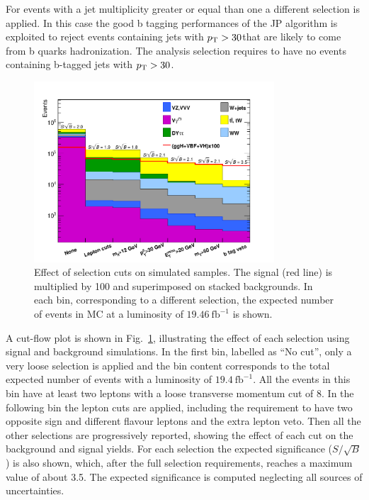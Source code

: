 For events with a jet multiplicity greater or equal than one a different selection is applied. In this case the good b tagging performances of the JP algorithm is exploited to reject events containing jets with $p_\mathrm{T} > 30$\GeV that are likely to come from b quarks hadronization. The analysis selection requires to have no events containing b-tagged jets with $p_\mathrm{T} > 30$\GeV.

\begin{figure}[htb]
\centering
\includegraphics[width=0.8\textwidth]{images/cutflow-thesis.pdf}
\caption{Effect of selection cuts on simulated samples. The signal (red line) is multiplied by 100 and superimposed on stacked backgrounds. In each bin, corresponding to a different selection, the expected number of events in MC at a luminosity of $19.46~\mathrm{fb}^{-1}$ is shown.}\label{fig:cutflow}
\end{figure}

A cut-flow plot is shown in Fig.~\ref{fig:cutflow}, illustrating the effect of each selection using signal and background simulations. In the first bin, labelled as ``No cut'', only a very loose selection is applied and the bin content corresponds to the total expected number of events with a luminosity of $19.4~\mathrm{fb}^{-1}$. All the events in this bin have at least two leptons with a loose transverse momentum cut of 8\GeV. In the following bin the lepton cuts are applied, including the requirement to have two opposite sign and different flavour leptons and the extra lepton veto. Then all the other selections are progressively reported, showing the effect of each cut on the background and signal yields. For each selection the expected significance ($S/\sqrt{B}$) is also shown, which, after the full selection requirements, reaches a maximum value of about 3.5. The expected significance is computed neglecting all sources of uncertainties.


